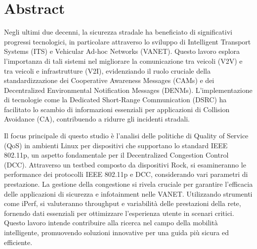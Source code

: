 \thispagestyle{plain}
\section*{Abstract}
Negli ultimi due decenni, la sicurezza stradale ha beneficiato di significativi progressi tecnologici, in particolare attraverso lo sviluppo di Intelligent Transport Systems (ITS) e Vehicular Ad-hoc Networks (VANET). Questo lavoro esplora l'importanza di tali sistemi nel migliorare la comunicazione tra veicoli (V2V) e tra veicoli e infrastrutture (V2I), evidenziando il ruolo cruciale della standardizzazione dei Cooperative Awareness Messages (CAMs) e dei Decentralized Environmental Notification Messages (DENMs). L'implementazione di tecnologie come la Dedicated Short-Range Communication (DSRC) ha facilitato lo scambio di informazioni essenziali per applicazioni di Collision Avoidance (CA), contribuendo a ridurre gli incidenti stradali.

Il focus principale di questo studio è l'analisi delle politiche di Quality of Service (QoS) in ambienti Linux per dispositivi che supportano lo standard IEEE 802.11p, un aspetto fondamentale per il Decentralized Congestion Control (DCC). Attraverso un testbed composto da dispositivi Rock, si esamineranno le performance dei protocolli IEEE 802.11p e DCC, considerando vari parametri di prestazione. La gestione della congestione si rivela cruciale per garantire l'efficacia delle applicazioni di sicurezza e infotainment nelle VANET. Utilizzando strumenti come iPerf, si valuteranno throughput e variabilità delle prestazioni della rete, fornendo dati essenziali per ottimizzare l'esperienza utente in scenari critici. Questo lavoro intende contribuire alla ricerca nel campo della mobilità intelligente, promuovendo soluzioni innovative per una guida più sicura ed efficiente.
